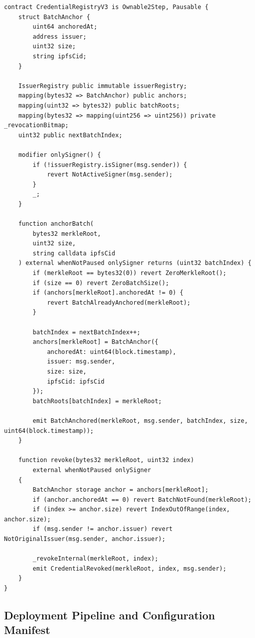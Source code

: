 \begin{lstlisting}[language=Solidity]
contract CredentialRegistryV3 is Ownable2Step, Pausable {
    struct BatchAnchor {
        uint64 anchoredAt;
        address issuer;
        uint32 size;
        string ipfsCid;
    }

    IssuerRegistry public immutable issuerRegistry;
    mapping(bytes32 => BatchAnchor) public anchors;
    mapping(uint32 => bytes32) public batchRoots;
    mapping(bytes32 => mapping(uint256 => uint256)) private _revocationBitmap;
    uint32 public nextBatchIndex;

    modifier onlySigner() {
        if (!issuerRegistry.isSigner(msg.sender)) {
            revert NotActiveSigner(msg.sender);
        }
        _;
    }

    function anchorBatch(
        bytes32 merkleRoot,
        uint32 size,
        string calldata ipfsCid
    ) external whenNotPaused onlySigner returns (uint32 batchIndex) {
        if (merkleRoot == bytes32(0)) revert ZeroMerkleRoot();
        if (size == 0) revert ZeroBatchSize();
        if (anchors[merkleRoot].anchoredAt != 0) {
            revert BatchAlreadyAnchored(merkleRoot);
        }

        batchIndex = nextBatchIndex++;
        anchors[merkleRoot] = BatchAnchor({
            anchoredAt: uint64(block.timestamp),
            issuer: msg.sender,
            size: size,
            ipfsCid: ipfsCid
        });
        batchRoots[batchIndex] = merkleRoot;

        emit BatchAnchored(merkleRoot, msg.sender, batchIndex, size, uint64(block.timestamp));
    }

    function revoke(bytes32 merkleRoot, uint32 index) 
        external whenNotPaused onlySigner 
    {
        BatchAnchor storage anchor = anchors[merkleRoot];
        if (anchor.anchoredAt == 0) revert BatchNotFound(merkleRoot);
        if (index >= anchor.size) revert IndexOutOfRange(index, anchor.size);
        if (msg.sender != anchor.issuer) revert NotOriginalIssuer(msg.sender, anchor.issuer);

        _revokeInternal(merkleRoot, index);
        emit CredentialRevoked(merkleRoot, index, msg.sender);
    }
}
\end{lstlisting}

\subsection{Deployment Pipeline and Configuration Manifest}


